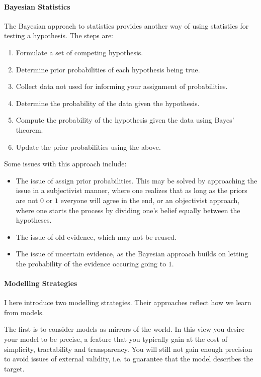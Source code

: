 \paragraph{Bayesian Statistics}
The Bayesian approach to statistics provides another way of using statistics for testing a hypothesis. The steps are:
\begin{enumerate}
	\item Formulate a set of competing hypothesis.
	\item Determine prior probabilities of each hypothesis being true.
	\item Collect data not used for informing your assignment of probabilities.
	\item Determine the probability of the data given the hypothesis.
	\item Compute the probability of the hypothesis given the data using Bayes' theorem.
	\item Update the prior probabilities using the above.
\end{enumerate}

Some issues with this approach include:
\begin{itemize}
	\item The issue of assign prior probabilities. This may be solved by approaching the issue in a subjectivist manner, where one realizes that as long as the priors are not $0$ or $1$ everyone will agree in the end, or an objectivist approach, where one starts the process by dividing one's belief equally between the hypotheses.
	\item The issue of old evidence, which may not be reused.
	\item The issue of uncertain evidence, as the Bayesian approach builds on letting the probability of the evidence occuring going to $1$.
\end{itemize}

\paragraph{Modelling Strategies}
I here introduce two modelling strategies. Their approaches reflect how we learn from models.

The first is to consider models as mirrors of the world. In this view you desire your model to be precise, a feature that you typically gain at the cost of simplicity, tractability and transparency. You will still not gain enough precision to avoid issues of external validity, i.e. to guarantee that the model describes the target.

